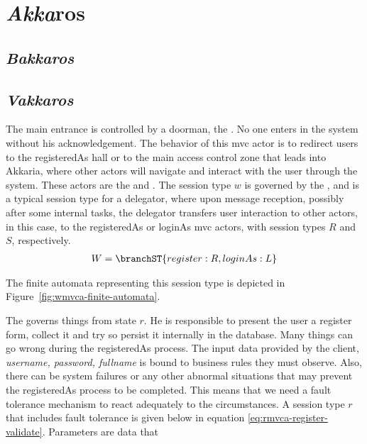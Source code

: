 
\chapter{\emph{Akka}ros}
\label{sec:akkaros}

\section{\emph{Bakkaros}}
\label{sec:bakkaros}

\section{\emph{Vakkaros}}
\label{sec:vaakkaros}

The main entrance is controlled by a doorman, the
. No one enters in the system without his
acknowledgement. The behavior of this mvc actor is to redirect users
to the registeredAs hall or to the main access control zone that leads
into Akkaria, where other actors will navigate and interact with the
user through the system. These actors are the 
and .
%
The session type $w$ is governed by the , and is
a typical session type for a delegator, where upon message reception,
possibly after some internal tasks, the delegator transfers user
interaction to other actors, in this case, to the registeredAs or
loginAs mvc actors, with session types $R$ and $S$, respectively.
%
\begin{align}
  W = \branchST{register: R, loginAs: L}
\end{align}
%
\par
%
The finite automata representing this session type is depicted in
Figure~\ref{fig:wmvca-finite-automata}.
%

%
\par
%
The  governs things from state $r$. He is
responsible to present the user a register form, collect it and try so
persist it internally in the database.
%
Many things can go wrong during the registeredAs process. The input
data provided by the client, \emph{username, password, fullname} is
bound to business rules they must observe. Also, there can be system
failures or any other abnormal situations that may prevent the
registeredAs process to be completed. This means that we need a fault
tolerance mechanism to react adequately to the circumstances.
%
A session type $r$ that includes fault tolerance is given below in
equation \ref{eq:rmvca-register-validate}. Parameters are data that
